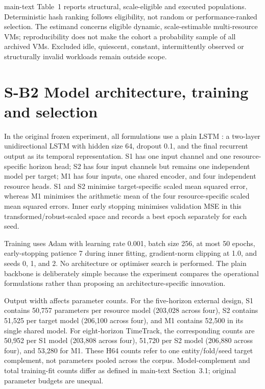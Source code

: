 \documentclass[a4paper,11pt]{article}
\begin{document}
main-text Table~1 reports structural, scale-eligible and executed
populations. Deterministic hash ranking follows eligibility, not random or
performance-ranked selection. The estimand concerns eligible dynamic,
scale-estimable multi-resource VMs; reproducibility does not make the cohort
a probability sample of all archived VMs. Excluded idle, quiescent, constant,
intermittently observed or structurally invalid workloads remain outside scope.

\clearpage
\section*{S-B2 Model architecture, training and selection}
In the original frozen experiment, all formulations use a plain LSTM
\citep{Hochreiter1997LSTM}: a two-layer
unidirectional LSTM with hidden size 64, dropout 0.1, and the final recurrent
output as its temporal representation.  S1 has one input channel and one
resource-specific horizon head; S2 has four input channels but remains one
independent model per target; M1 has four inputs, one shared encoder, and four
independent resource heads.  S1 and S2 minimise target-specific scaled mean
squared error, whereas M1 minimises the arithmetic mean of the four
resource-specific scaled mean squared errors. Inner early stopping minimises
validation MSE in this transformed/robust-scaled space and records a best
epoch separately for each seed.

Training uses Adam with learning rate 0.001, batch size 256, at most 50 epochs,
early-stopping patience 7 during inner fitting, gradient-norm clipping at 1.0,
and seeds 0, 1, and 2.  No architecture or optimiser search is performed.  The
plain backbone is deliberately simple because the experiment compares the
operational formulations rather than proposing an architecture-specific
innovation.

Output width affects parameter counts.  For the five-horizon external design,
S1 contains 50,757 parameters per resource model (203,028 across four), S2
contains 51,525 per target model (206,100 across four), and M1 contains 52,500
in its single shared model.  For eight-horizon TimeTrack, the corresponding
counts are 50,952 per S1 model (203,808 across four), 51,720 per S2 model
(206,880 across four), and 53,280 for M1. These H64 counts refer to one
entity/fold/seed target complement, not parameters pooled across the corpus.
Model-complement and total training-fit counts differ as defined in
main-text Section~3.1; original parameter budgets are unequal.
\end{document}
